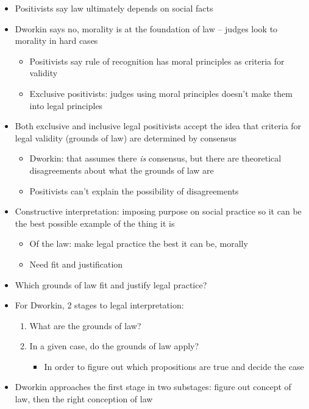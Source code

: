 \begin{itemize}
\tightlist
\item
  Positivists say law ultimately depends on social facts
\item
  Dworkin says no, morality is at the foundation of law -- judges look
  to morality in hard cases

  \begin{itemize}
  \tightlist
  \item
    Positivists say rule of recognition has moral principles as criteria
    for validity
  \item
    Exclusive positivists: judges using moral principles doesn't make
    them into legal principles
  \end{itemize}
\item
  Both exclusive and inclusive legal positivists accept the idea that
  criteria for legal validity (grounds of law) are determined by
  consensus

  \begin{itemize}
  \tightlist
  \item
    Dworkin: that assumes there \emph{is} consensus, but there are
    theoretical disagreements about what the grounds of law are
  \item
    Positivists can't explain the possibility of disagreements
  \end{itemize}
\item
  Constructive interpretation: imposing purpose on social practice so it
  can be the best possible example of the thing it is

  \begin{itemize}
  \tightlist
  \item
    Of the law: make legal practice the best it can be, morally
  \item
    Need fit and justification
  \end{itemize}
\item
  Which grounds of law fit and justify legal practice?
\item
  For Dworkin, 2 stages to legal interpretation:

  \begin{enumerate}
  \def\labelenumi{\arabic{enumi}.}
  \tightlist
  \item
    What are the grounds of law?
  \item
    In a given case, do the grounds of law apply?

    \begin{itemize}
    \tightlist
    \item
      In order to figure out which propositions are true and decide the
      case
    \end{itemize}
  \end{enumerate}
\item
  Dworkin approaches the first stage in two substages: figure out
  concept of law, then the right conception of law


\end{itemize}
